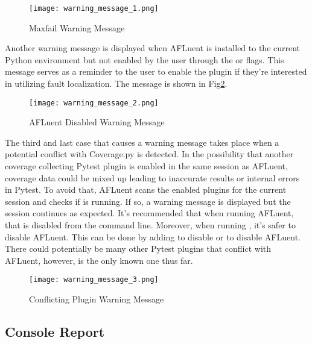 \begin{figure}[!htb]
	\begin{center}
		\texttt{[image: warning\_message\_1.png]}
		\caption{\label{fig:warning_message_1} Maxfail Warning Message}
	\end{center}
\end{figure}

Another warning message is displayed when AFLuent is installed to the current
Python environment but not enabled by the user through the  or
 flags. This message serves as a reminder to the user to
enable the plugin if they're interested in utilizing fault localization. The
message is shown in Fig\ref{fig:warning_message_2}.

\begin{figure}[!htb]
	\begin{center}
		\texttt{[image: warning\_message\_2.png]}
		\caption{\label{fig:warning_message_2} AFLuent Disabled Warning Message}
	\end{center}
\end{figure}

The third and last case that causes a warning message takes place when a potential
conflict with Coverage.py is detected. In the possibility that another coverage
collecting Pytest plugin is enabled in the same session as AFLuent, coverage
data could be mixed up leading to inaccurate results or internal errors in
Pytest. To avoid that, AFLuent scans the enabled plugins for the current session
and checks if  is running. If so, a warning message is
displayed but the session continues as expected. It's recommended that when running
AFLuent, that  is disabled from the command line. Moreover, when
running , it's safer to disable AFLuent. This can be done by
adding  to disable  or  to disable AFLuent. There could potentially be many
other Pytest plugins that conflict with AFLuent, however,  is
the only known one thus far.

\begin{figure}[!htb]
	\begin{center}
		\texttt{[image: warning\_message\_3.png]}
		\caption{\label{fig:warning_message_3} Conflicting Plugin Warning Message}
	\end{center}
\end{figure}

\subsection{Console Report}
\label{subsec:console_output}

